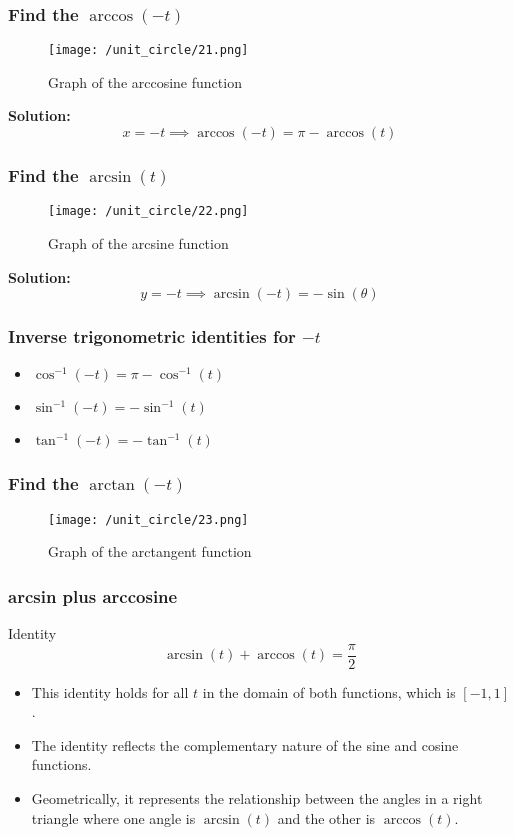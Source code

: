 \begin{frame}
    \frametitle{Find the \(\arccos(-t)\)}
    \begin{figure}
        \centering
        \texttt{[image: /unit\_circle/21.png]}
        \caption{Graph of the arccosine function}
    \end{figure}
    \textbf{Solution:} 
    \[ x = -t \implies \arccos(-t) = \pi - \arccos(t) \] 
\end{frame}

\begin{frame}
\frametitle{Find the \(\arcsin(t)\)}
\begin{figure}
    \centering
    \texttt{[image: /unit\_circle/22.png]}
    \caption{Graph of the arcsine function}
\end{figure}
\textbf{Solution:} 
\[ y = -t \implies \arcsin(-t) = -\sin(\theta) \] 
\end{frame}

\begin{frame}
    \frametitle{Inverse trigonometric identities for \(-t\)}
    \begin{itemize}
        \item \( \cos^{-1}(-t) = \pi - \cos^{-1}(t) \)
        \item \( \sin^{-1}(-t) = - \sin^{-1}(t) \)  
        \item \( \tan^{-1}(-t) = -\tan^{-1}(t) \)
    \end{itemize}
\end{frame}

\begin{frame}
    \frametitle{Find the \(\arctan(-t)\)}
    \begin{figure}
        \centering
        \texttt{[image: /unit\_circle/23.png]}
        \caption{Graph of the arctangent function}
    \end{figure}
\end{frame}

\begin{frame}
    \frametitle{arcsin plus arccosine}
    \begin{block}{Identity}
        \[ \arcsin(t) + \arccos(t) = \frac{\pi}{2} \]
    \end{block}
    \begin{itemize}
        \item This identity holds for all \(t\) in the domain of both functions, which is \([-1, 1]\).
        \item The identity reflects the complementary nature of the sine and cosine functions.
        \item Geometrically, it represents the relationship between the angles in a right triangle where one angle is \(\arcsin(t)\) and the other is \(\arccos(t)\).
    \end{itemize}   
\end{frame}


